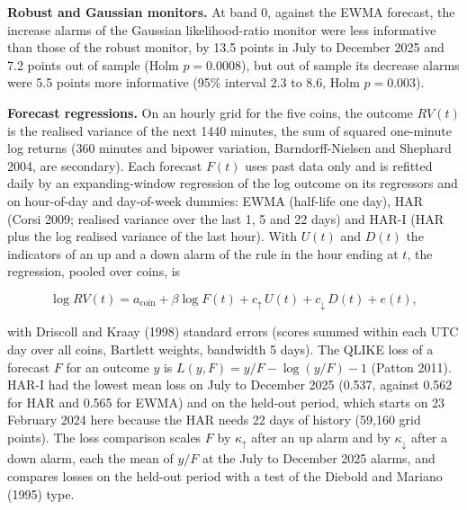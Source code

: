 \documentclass[
]{article}
\begin{document}
\textbf{Robust and Gaussian monitors.} At band 0, against the EWMA
forecast, the increase alarms of the Gaussian likelihood-ratio monitor
were less informative than those of the robust monitor, by 13.5 points
in July to December 2025 and 7.2 points out of sample (Holm
\(p = 0.0008\)), but out of sample its decrease alarms were 5.5 points
more informative (95\% interval 2.3 to 8.6, Holm \(p = 0.003\)).

\textbf{Forecast regressions.} On an hourly grid for the five coins, the
outcome \(RV(t)\) is the realised variance of the next 1440 minutes, the
sum of squared one-minute log returns (360 minutes and bipower
variation, Barndorff-Nielsen and Shephard 2004, are secondary). Each
forecast \(F(t)\) uses past data only and is refitted daily by an
expanding-window regression of the log outcome on its regressors and on
hour-of-day and day-of-week dummies: EWMA (half-life one day), HAR
(Corsi 2009; realised variance over the last 1, 5 and 22 days) and HAR-I
(HAR plus the log realised variance of the last hour). With \(U(t)\) and
\(D(t)\) the indicators of an up and a down alarm of the rule in the
hour ending at \(t\), the regression, pooled over coins, is

\[\log RV(t) = a_{\text{coin}} + \beta \log F(t) + c_{\uparrow}\, U(t) + c_{\downarrow}\, D(t) + e(t),\]

with Driscoll and Kraay (1998) standard errors (scores summed within
each UTC day over all coins, Bartlett weights, bandwidth 5 days). The
QLIKE loss of a forecast \(F\) for an outcome \(y\) is
\(L(y, F) = y/F - \log(y/F) - 1\) (Patton 2011). HAR-I had the lowest
mean loss on July to December 2025 (0.537, against 0.562 for HAR and
0.565 for EWMA) and on the held-out period, which starts on 23 February
2024 here because the HAR needs 22 days of history (59,160 grid points).
The loss comparison scales \(F\) by \(\kappa_{\uparrow}\) after an up
alarm and by \(\kappa_{\downarrow}\) after a down alarm, each the mean
of \(y/F\) at the July to December 2025 alarms, and compares losses on
the held-out period with a test of the Diebold and Mariano (1995) type.
\end{document}
